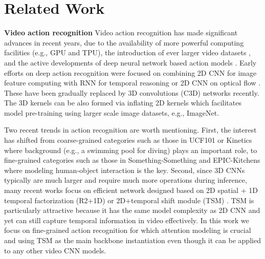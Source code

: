 \documentclass[runningheads]{llncs}
\newcommand{\keypoint}[1]{\vspace{0.1cm}\noindent\textbf{#1}\quad}
\begin{document}
\section{Related Work}

\keypoint{Video action recognition}
Video action recognition has made significant advances
in recent years, due to the availability of more powerful computing facilities (e.g., GPU and TPU),
the introduction of ever larger video datasets \cite{carreira2017quo,damen2018scaling,goyal2017something,karpathy2014large},
and the active developments of deep neural network based  action models \cite{feichtenhofer2019slowfast,lin2019tsm,Martinez_2019_ICCV,tran2018closer,wang2016temporal,wang2018non,wang2018videos,zhou2018temporal,zolfaghari2018eco}.
Early efforts on deep action recognition were focused on combining 2D CNN for image feature computing with  RNN for temporal reasoning
\cite{baccouche2011sequential,donahue2015long,yue2015beyond,zhou2018temporal} or 2D CNN on optical flow \cite{simonyan2014two}.
These have been gradually replaced by 3D convolutions (C3D) networks \cite{ji20123d,tran2015learning} recently.
The 3D kernels can be also formed via
inflating 2D kernels \cite{carreira2017quo} 
which facilitates
model pre-training using larger scale image datasets,
e.g., ImageNet. 

Two recent trends in action recognition are worth mentioning. First, the interest has shifted from coarse-grained categories such as those in UCF101 \cite{soomro2012ucf101} or Kinetics \cite{carreira2017quo} where background (e.g., a swimming pool for diving) plays an important role, to fine-grained categories such as those in Something-Something \cite{goyal2017something} and EPIC-Kitchens \cite{damen2018scaling} where modeling human-object interaction is the key. 
Second, since 3D CNNs typically are much larger and require much more operations during inference, many recent works focus on efficient network designed based on 2D spatial + 1D temporal factorization (R2+1D) \cite{MoreIsLess19,qiu2017learning,tran2018closer} or 2D+temporal shift module (TSM) \cite{Tran2019channel-separated}. TSM is particularly attractive because it has the same model complexity as 2D CNN and yet can still capture temporal information in video effectively. In this work we focus on fine-grained action recognition for which attention modeling is crucial and using TSM as the main backbone instantiation even though it can be applied to any other video CNN models.    

 
\end{document}
